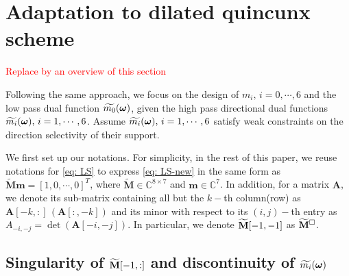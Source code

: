 \section{Adaptation to dilated quincunx scheme}

\textcolor{red}{Replace by an overview of this section}

Following the same approach, we focus on the design of $m_i,\,i=0,\cdots,6$ and the low pass dual function $\widetilde{m_{0}}(\boldsymbol{\omega})$, given the high pass directional dual functions $\widetilde{m_{i}}(\boldsymbol{\omega}),\,i=1,\cdots,6$. Assume $\widetilde{m_{i}}(\boldsymbol{\omega}),\,i=1,\cdots,6$ satisfy weak constraints on the direction selectivity of their support.

We first set up our notations. For simplicity, in the rest of this paper, we reuse notations for \eqref{eq: LS} to express \eqref{eq: LS-new} in the same form as $\widetilde{\mathbf{M}}\mathbf{m} = [1,0,\cdots,0]^T$, where $\widetilde{\mathbf{M}}\in\mathbb{C}^{8\times 7}$ and $\mathbf{m}\in\mathbb{C}^7$. In addition, for a matrix $\mathbf{A}$, we denote its sub-matrix containing all but the $k-$th column(row) as $\mathbf{A}[-k,:]\, (\mathbf{A}[:,-k])$ and its minor with respect to its $(i,j)-$th entry as $A_{-i,-j} = \det(\mathbf{A}[-i,-j])$. In particular, we denote $\widetilde{\mathbf{M}}[-1,-1]$ as $\widetilde{\mathbf{M}}^{\Box}$.

\subsection{Singularity of $\widetilde{\mathbf{M}}[-1,:]$ and discontinuity of $\widetilde{m_{i}}(\boldsymbol{\omega})$}


